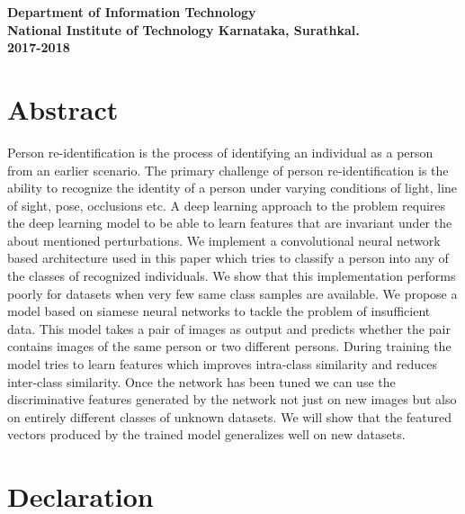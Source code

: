 \documentclass{article}[12pt,a4paper]
\begin{document}
\begin{titlepage}
\begin{singlespacing}
\begin{figure}[!ht]
    \end{figure}
    \vspace{1em}
    {\Large \bfseries Department of Information Technology}\\
    \vspace{0.5em}
    {\Large \bfseries National Institute of Technology Karnataka, Surathkal.}\\
    \vspace{1em}
    {\Large \bfseries 2017-2018}
    
    \end{singlespacing}
\end{titlepage}

\section*{Abstract}

Person re-identification is the process of identifying an individual as a person from an earlier scenario. The primary challenge of person re-identification is the ability to recognize the identity of a person under varying conditions of light, line of sight, pose, occlusions etc. A deep learning approach to the problem requires the deep learning model to be able to learn features that are invariant under the about mentioned perturbations. We implement a convolutional neural network based architecture used in this paper\cite{base_paper} which tries to classify a person into any of the classes of recognized individuals. We show that this implementation performs poorly for datasets when very few same class samples are available. We propose a model based on siamese neural networks to tackle the problem of insufficient data. This model takes a pair of images as output and predicts whether the pair contains images of the same person or two different persons. During training the model tries to learn features which improves intra-class similarity and reduces inter-class similarity. Once the network has been tuned we can use the discriminative features generated by the network not just on new images but also on entirely different classes of unknown datasets. We will show that the featured vectors produced by the trained model generalizes well on new datasets.

\newpage
\section*{Declaration}
\end{document}
